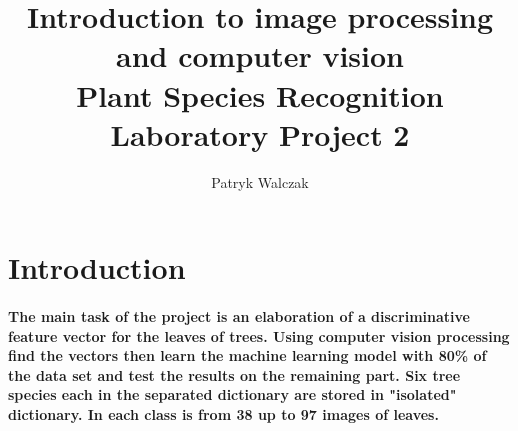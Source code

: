 \documentclass[12pt]{article}
\title{
\large Introduction to image processing and computer vision \\
\LARGE \textbf{Plant Species Recognition} \\
Laboratory Project 2
}
\author{Patryk Walczak}
\begin{document}
\maketitle

\tableofcontents

\thispagestyle{empty}

\newpage

\clearpage
{}

\section{Introduction}

\paragraph{
The main task of the project is an elaboration of a discriminative feature vector for the leaves of trees. Using computer vision processing find the vectors then learn the machine learning model with 80\% of the data set and test the results on the remaining part. Six tree species each in the separated dictionary are stored in "isolated" dictionary. In each class is from 38 up to 97 images of leaves.
}
\end{document}
